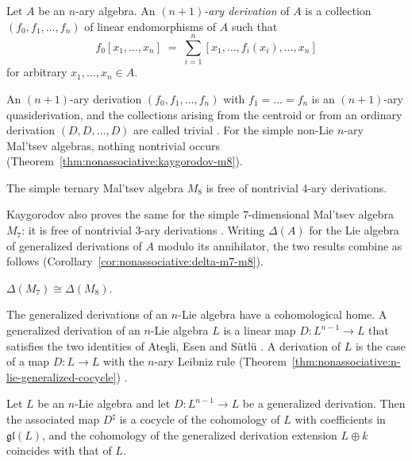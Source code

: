\begin{definition}
\label{def:nonassociative:n1ary}
Let $A$ be an $n$-ary algebra. An \emph{$(n+1)$-ary derivation} of $A$ is a
collection $(f_0,f_1,\dots,f_n)$ of linear endomorphisms of $A$ such that
\[
f_0[x_1,\dots,x_n]\;=\;\sum_{i=1}^{n}[x_1,\dots,f_i(x_i),\dots,x_n]
\]
for arbitrary $x_1,\dots,x_n\in A$.
\end{definition}

An $(n+1)$-ary derivation $(f_0,f_1,\dots,f_n)$ with
$f_1=\dots=f_n$ is an $(n+1)$-ary quasiderivation, and the collections
arising from the centroid or from an ordinary derivation
$(D,D,\dots,D)$ are called trivial
\cite[pp.~576--577]{Kaygorodov2014n1aryMaltsev}. For the simple non-Lie
$n$-ary Mal'tsev algebras, nothing nontrivial occurs (Theorem~\ref{thm:nonassociative:kaygorodov-m8}).

\begin{theorem}
\label{thm:nonassociative:kaygorodov-m8}
The simple ternary Mal'tsev algebra $M_8$ is free of nontrivial $4$-ary
derivations.
\end{theorem}

Kaygorodov also proves the same for the simple $7$-dimensional Mal'tsev
algebra $M_7$: it is free of nontrivial $3$-ary derivations
\cite[Theorem~1, p.~579]{Kaygorodov2014n1aryMaltsev}. Writing $\Delta(A)$
for the Lie algebra of generalized derivations of $A$ modulo its annihilator,
the two results combine as follows (Corollary~\ref{cor:nonassociative:delta-m7-m8}). %

\begin{corollary}
\label{cor:nonassociative:delta-m7-m8}
$\Delta(M_7)\cong\Delta(M_8)$.
\end{corollary}

The generalized derivations of an $n$-Lie algebra have a cohomological home. A
generalized derivation of an $n$-Lie algebra $L$ is a linear map
$D\colon L^{n-1}\to L$ that satisfies the two identities of Ateşli, Esen and
Sütlü \cite[equations~(2.9)--(2.10), p.~12]{AtesliEsenSutlu2021}. A derivation of
$L$ is the case of a map $D\colon L\to L$ with the $n$-ary Leibniz rule (Theorem~\ref{thm:nonassociative:n-lie-generalized-cocycle})
\cite[p.~12]{AtesliEsenSutlu2021}.\begin{theorem}\label{thm:nonassociative:n-lie-generalized-cocycle}
Let $L$ be an $n$-Lie algebra and let $D\colon L^{n-1}\to L$ be a generalized
derivation. Then the associated map $D^{\sharp}$ is a cocycle of the cohomology
of $L$ with coefficients in $\mathfrak{gl}(L)$, and the cohomology of the
generalized derivation extension $L\oplus k$ coincides with that of $L$.
\end{theorem}

